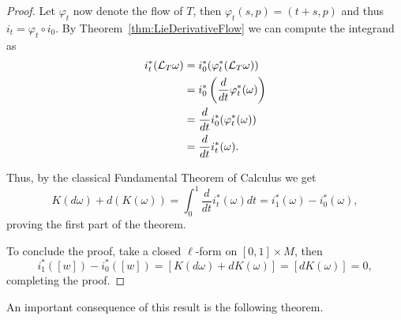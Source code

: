 \begin{proof}
  Let $\varphi_t$ now denote the flow of $T$, then $\varphi_t(s, p) = (t+s, p)$ and thus $i_t = \varphi_t \circ i_0$.
  By Theorem~\ref{thm:LieDerivativeFlow} we can compute the integrand as
  \begin{align}
    i_t^*(\mathcal{L}_T\omega) &= i^*_0(\varphi_t^*(\mathcal{L}_T\omega)) \\
                       &= i_0^*\left(\frac{d}{dt} \varphi_t^*(\omega)\right) \\
                       &= \frac{d}{dt} i_0^*(\varphi_t^*(\omega)) \\
                       &= \frac{d}{dt} i_t^*(\omega).
  \end{align}

  Thus, by the classical Fundamental Theorem of Calculus we get
  \begin{equation}
    K(d\omega) + d(K(\omega)) = \int_0^1 \frac{d}{dt} i_t^*(\omega) dt = i_1^*(\omega) - i_0^*(\omega),
  \end{equation}
  proving the first part of the theorem.

  To conclude the proof, take a closed $\ell$-form on $[0,1]\times M$, then
  \begin{equation}
    i_1^*([w]) - i_0^*([w]) = [K(d\omega) + dK(\omega)] = [dK(\omega)] =0,
  \end{equation}
  completing the proof.
\end{proof}

An important consequence of this result is the following theorem.

